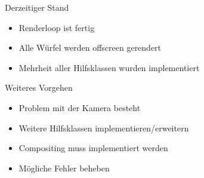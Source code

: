 \documentclass{../presentation}
\begin{document}
\frame[plain]{\titlepage}

\begin{frame}{Derzeitiger Stand}
    \begin{itemize}
        \item Renderloop ist fertig
        \item Alle Würfel werden offscreen gerendert
        \item Mehrheit aller Hilfsklassen wurden implementiert
    \end{itemize}
\end{frame}

\begin{frame}{Weiteres Vorgehen}
    \begin{itemize}
        \item Problem mit der Kamera besteht
        \item Weitere Hilfsklassen implementieren/erweitern
        \item Compositing muss implementiert werden
        \item Mögliche Fehler beheben
    \end{itemize}
\end{frame}
\end{document}

